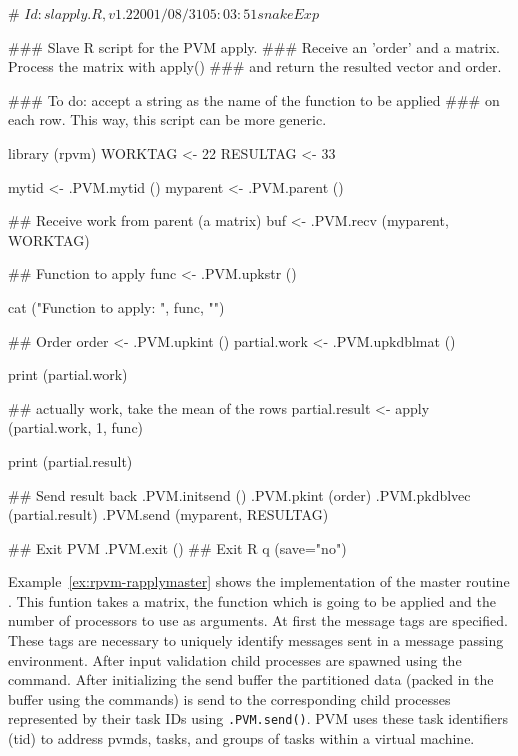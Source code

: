 \begin{Example}
\begin{Scode}

# $Id: slapply.R,v 1.2 2001/08/31 05:03:51 snake Exp $

### Slave R script for the PVM apply.
### Receive an 'order' and a matrix.  Process the matrix with apply()
### and return the resulted vector and order.

### To do: accept a string as the name of the function to be applied
### on each row.  This way, this script can be more generic. 

library (rpvm)
WORKTAG <- 22
RESULTAG <- 33

mytid  <- .PVM.mytid ()
myparent  <- .PVM.parent ()

## Receive work from parent (a matrix)
buf <- .PVM.recv (myparent, WORKTAG)

## Function to apply
func  <- .PVM.upkstr ()

cat ("Function to apply: ", func, "\n")

## Order
order <- .PVM.upkint ()
partial.work <- .PVM.upkdblmat ()

print (partial.work)

## actually work, take the mean of the rows
partial.result <- apply (partial.work, 1, func)

print (partial.result)

## Send result back
.PVM.initsend ()
.PVM.pkint (order)
.PVM.pkdblvec (partial.result)
.PVM.send (myparent, RESULTAG)

## Exit PVM
.PVM.exit ()
## Exit R
q (save="no")
\end{Scode}
\label{ex:rpvm-rapplyslave}
\end{Example}


Example~\ref{ex:rpvm-rapplymaster} shows the implementation of the
master routine . This funtion takes a matrix,
the function which is going to be applied and the number of processors
to use as arguments. At first 
the message tags are specified. These tags are necessary to uniquely
identify messages sent in a message passing environment. After
input validation  child processes are spawned using the
 command. After initializing the send buffer the
partitioned data (packed in the buffer using the 
commands) is send to the corresponding child processes represented by
their task IDs using
\texttt{.PVM.send()}. PVM uses these task identifiers (tid) to
address pvmds, tasks, and groups of tasks within a virtual
machine.

